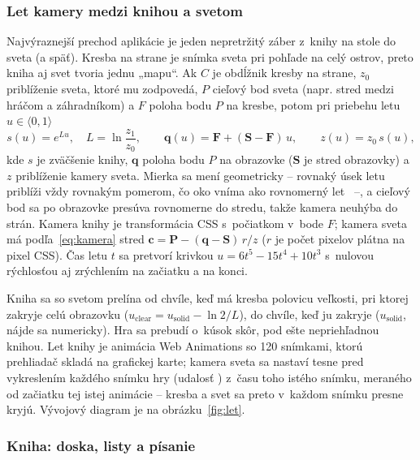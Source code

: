 \documentclass[11pt, a4paper]{article}
\begin{document}
\subsubsection{Let kamery medzi knihou a svetom}

Najvýraznejší prechod aplikácie je jeden nepretržitý záber z~knihy na stole do sveta (a späť).
Kresba na strane je snímka sveta pri pohľade na celý ostrov, preto kniha aj svet tvoria
jednu „mapu“. Ak $C$ je obdĺžnik kresby na strane, $z_0$ priblíženie sveta, ktoré mu zodpovedá,
$P$ cieľový bod sveta (napr. stred medzi hráčom a záhradníkom) a $F$ poloha bodu $P$ na kresbe,
potom pri priebehu letu $u \in \langle 0, 1 \rangle$
\begin{equation}
  s(u) = e^{L u}, \quad L = \ln\frac{z_1}{z_0}, \qquad
  \mathbf{q}(u) = \mathbf{F} + (\mathbf{S} - \mathbf{F})\,u, \qquad z(u) = z_0\, s(u),
\end{equation}
kde $s$ je zväčšenie knihy, $\mathbf{q}$ poloha bodu $P$ na obrazovke ($\mathbf{S}$ je stred
obrazovky) a $z$ priblíženie kamery sveta. Mierka sa mení geometricky – rovnaký úsek letu
priblíži vždy rovnakým pomerom, čo oko vníma ako rovnomerný let~\cite{VanWijk2003} –,
a cieľový bod sa po obrazovke presúva rovnomerne do stredu, takže kamera neuhýba do strán.
Kamera knihy je transformácia CSS  s~počiatkom v~bode $F$;
kamera sveta má podľa~\eqref{eq:kamera} stred $\mathbf{c} = \mathbf{P} - (\mathbf{q} - \mathbf{S})\,r / z$
($r$ je počet pixelov plátna na pixel CSS). Čas letu $t$ sa pretvorí krivkou
$u = 6t^5 - 15t^4 + 10t^3$ s~nulovou rýchlosťou aj zrýchlením na začiatku a na konci.

Kniha sa so svetom prelína od chvíle, keď má kresba polovicu veľkosti, pri ktorej zakryje celú
obrazovku ($u_\text{clear} = u_\text{solid} - \ln 2 / L$), do chvíle, keď ju zakryje
($u_\text{solid}$, nájde sa numericky). Hra sa prebudí o~kúsok skôr, pod ešte nepriehľadnou
knihou. Let knihy je animácia Web Animations so 120 snímkami, ktorú prehliadač skladá na
grafickej karte; kamera sveta sa nastaví tesne pred vykreslením každého snímku hry (udalosť
) z~času toho istého snímku, meraného od začiatku tej istej animácie – kresba
a svet sa preto v~každom snímku presne kryjú. Vývojový diagram je na obrázku~\ref{fig:let}.

\subsubsection{Kniha: doska, listy a písanie}
\end{document}
